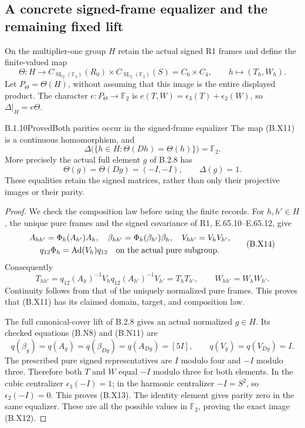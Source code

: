 \subsection{A concrete signed-frame equalizer and the remaining fixed lift}

On the multiplier-one group $H$ retain the actual signed
R1 frames and define the finite-valued map
\[
 \Theta:H\longrightarrow
 C_{\operatorname{SL}_2(\mathbb F_3)}(R_0)
       \times C_{\operatorname{SL}_2(\mathbb F_3)}(S)
       = C_6\times C_4,
 \qquad h\longmapsto(T_h,W_h).
 \tag{B.X11}
\]
Let $P_\Theta=\Theta(H)$, without assuming that this
image is the entire displayed product.  The character
$e:P_\Theta\to\mathbb F_2$ is
$e(T,W)=\epsilon_3(T)+\epsilon_2(W)$, so
$\Delta|_H=e\Theta$.

\begin{result}{B.1.10}{Proved}{Both parities occur in the signed-frame equalizer}
The map (B.X11) is a continuous homomorphism, and
\[
 \Delta\bigl(\{h\in H:\Theta(Dh)=\Theta(h)\}\bigr)
                       =\mathbb F_2.
 \tag{B.X12}
\]
More precisely the actual full element $g$ of B.2.8 has
\[
             \Theta(g)=\Theta(Dg)=(-I,-I),
             \qquad\Delta(g)=1.
 \tag{B.X13}
\]
These equalities retain the signed matrices, rather
than only their projective images or their parity.
\end{result}
\begin{proof}
We check the composition law before using the finite
records.  For $h,h'\in H$, the unique pure frames and
the signed covariance of R1, E.65.10--E.65.12, give
\[
 \begin{gathered}
 A_{hh'}=\Phi_h(A_{h'})A_h,\quad
 \beta_{hh'}=\Phi_h(\beta_{h'})\beta_h,\quad
 V_{hh'}=V_hV_{h'},\\
 q_{12}\Phi_h=\operatorname{Ad}(V_h)q_{12}
                  \quad\hbox{on the actual pure subgroup}.
 \end{gathered}                                      \tag{B.X14}
\]
Consequently
\[
 T_{hh'}=q_{12}(A_h)^{-1}V_h
                 q_{12}(A_{h'})^{-1}V_{h'}=T_hT_{h'},
 \qquad W_{hh'}=W_hW_{h'}.
 \tag{B.X15}
\]
Continuity follows from that of the uniquely normalized
pure frames.  This proves that (B.X11) has its claimed
domain, target, and composition law.

The full canonical-cover lift of B.2.8 gives an actual
normalized $g\in H$.  Its checked equations (B.N8) and
(B.N11) are
\[
 q(\beta_g)=q(A_g)=q(\beta_{Dg})=q(A_{Dg})=[5I],
       \qquad q(V_g)=q(V_{Dg})=I.
 \tag{B.X16}
\]
The prescribed pure signed representatives are $I$
modulo four and $-I$ modulo three.  Therefore both
$T$ and $W$ equal $-I$ modulo three for both elements.
In the cubic centralizer $\epsilon_3(-I)=1$; in the
harmonic centralizer $-I=S^2$, so
$\epsilon_2(-I)=0$.  This proves (B.X13).
The identity element gives parity zero in the same
equalizer.  These are all the possible values in
$\mathbb F_2$, proving the exact image (B.X12).
\end{proof}

